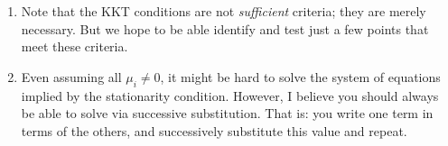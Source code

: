 \documentclass[11pt, oneside]{amsart}
\begin{document}
\begin{enumerate}
  \item Note that the KKT conditions are not \emph{sufficient} criteria;
  they are merely necessary. But we hope to be able identify and test
  just a few points that meet these criteria.

  \item Even assuming all $\mu_i \ne 0$, it might be hard to solve the
  system of equations implied by the stationarity condition. However, I
  believe you should always be able to solve via successive
  substitution. That is: you write one term in terms of the others, and
  successively substitute this value and repeat.
\end{enumerate}
\end{document}
